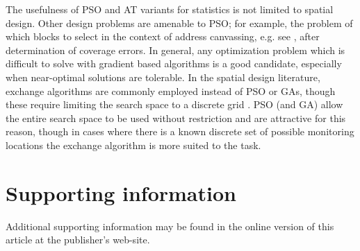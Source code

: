 \documentclass[cmbright]{staauth}
\begin{document}
The usefulness of PSO and AT variants for statistics is not limited to spatial design. Other design problems are amenable to PSO; for example, the problem of which blocks to select in the context of address canvassing, e.g. see \cite{young2016zero}, after determination of coverage errors. In general, any optimization problem which is difficult to solve with gradient based algorithms is a good candidate, especially when near-optimal solutions are tolerable. In the spatial design literature, exchange algorithms are commonly employed instead of PSO or GAs, though these require limiting the search space to a discrete grid \citep{nychka1998design,wikle1999space,wikle2005dynamic}. PSO (and GA) allow the entire search space to be used without restriction and are attractive for this reason, though in cases where there is a known discrete set of possible monitoring locations the exchange algorithm is more suited to the task.





\section{Supporting information}
Additional supporting information may be found in the online version of this article at the publisher's web-site.
\end{document}
